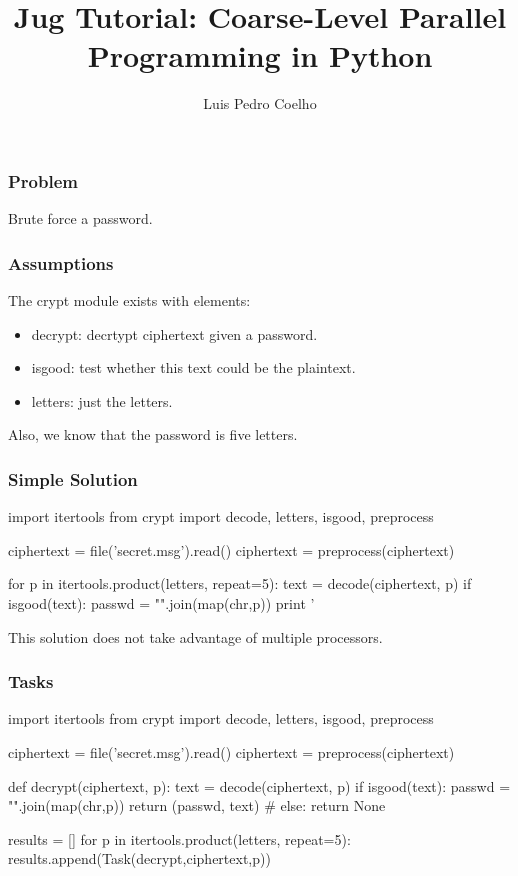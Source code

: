 \documentclass{beamer}
\title[Jug Tutorial 0]{Jug Tutorial: Coarse-Level Parallel Programming in Python}
\author{Luis Pedro Coelho}
\institute{luis@luispedro.org}
\begin{document}
\frame{\titlepage}
\begin{frame}[fragile]
\frametitle{Problem}
Brute force a password.
\end{frame}


\begin{frame}[fragile]
\frametitle{Assumptions}
The \alert{crypt} module exists with elements:
\begin{itemize}
\item decrypt: decrtypt ciphertext given a password.
\item isgood: test whether this text could be the plaintext.
\item letters: just the letters.
\end{itemize}

Also, we know that the password is five letters.
\end{frame}

\begin{frame}[fragile]
\frametitle{Simple Solution}

\begin{python}
import itertools
from crypt import decode, letters, isgood, preprocess

ciphertext = file('secret.msg').read()
ciphertext = preprocess(ciphertext)

for p in itertools.product(letters, repeat=5):
    text = decode(ciphertext, p)
    if isgood(text):
        passwd = "".join(map(chr,p))
        print '%
\end{python}
\end{frame}

\begin{frame}[fragile]

This solution does not take advantage of multiple processors.
\end{frame}


\begin{frame}[fragile]
\frametitle{Tasks}
\begin{python}
import itertools
from crypt import decode, letters, isgood, preprocess

ciphertext = file('secret.msg').read()
ciphertext = preprocess(ciphertext)

def decrypt(ciphertext, p):
    text = decode(ciphertext, p)
    if isgood(text):
        passwd = "".join(map(chr,p))
        return (passwd, text)
    # else: return None

results = []
for p in itertools.product(letters, repeat=5):
    results.append(Task(decrypt,ciphertext,p))
\end{python}
\end{frame}
\end{document}

